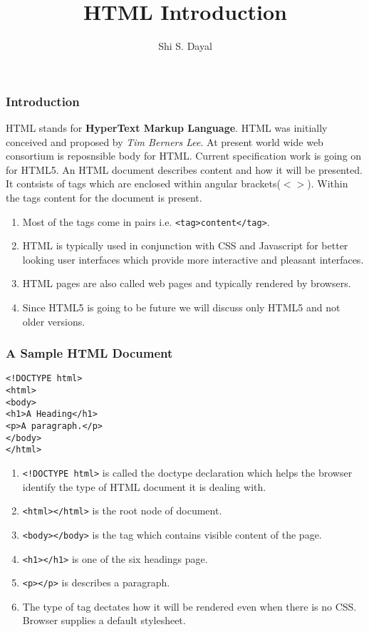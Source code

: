 \documentclass[aspectratio=1610]{beamer}
\begin{document}
\begin{frame}
\title{HTML Introduction}
\author{Shi S. Dayal}
\titlepage
\end{frame}

\begin{frame}
\frametitle{Introduction}
HTML stands for \textbf{HyperText Markup Language}. HTML was initially
conceived and proposed by \textit{Tim Berners Lee}. At present world wide web
consortium is reposnsible body for HTML. Current specification work is going on
for HTML5. An HTML document describes content and how it will be presented.
It contsists of tags which are enclosed within angular brackets($<>$). Within the
tags content for the document is present.

\begin{enumerate}
\item Most of the tags come in pairs i.e. \texttt{<tag>content</tag>}.

\item HTML is typically used in conjunction with CSS and Javascript for better
looking user interfaces which provide more interactive and pleasant
interfaces. 

\item HTML pages are also called web pages and typically rendered by browsers.

\item Since HTML5 is going to be future we will discuss only HTML5 and not older
versions.
\end{enumerate}
\end{frame}

\begin{frame}[fragile]
\frametitle{A Sample HTML Document}
\begin{verbatim}
<!DOCTYPE html>
<html>
<body>
<h1>A Heading</h1>
<p>A paragraph.</p>
</body>
</html>
\end{verbatim}
\begin{enumerate}
\item \texttt{<!DOCTYPE html>} is called the doctype declaration which helps the
browser identify the type of HTML document it is dealing with.

\item \texttt{<html></html>} is the root node of document.

\item \texttt{<body></body>} is the tag which contains visible content of the
  page.
\item \texttt{<h1></h1>} is one of the six headings page.
\item \texttt{<p></p>} is describes a paragraph.
\item The type of tag dectates how it will be rendered even when there is no
  CSS. Browser supplies a default stylesheet.
\end{enumerate}
\end{frame}
\end{document}
